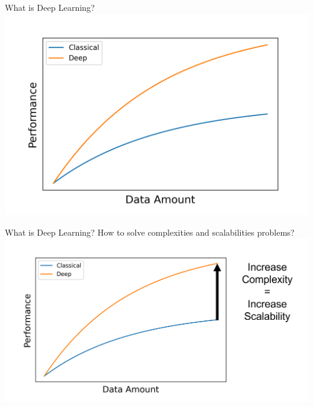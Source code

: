 \documentclass{beamer}
\begin{document}
\begin{frame}[fragile]{What is Deep Learning?}
    \includegraphics[width=\textwidth,height=\textheight,keepaspectratio]{figures/Deep vs Classical.png}
\end{frame}
\begin{frame}[fragile]{What is Deep Learning?}
    How to solve complexities and scalabilities problems?
    \includegraphics[width=\textwidth,height=\textheight,keepaspectratio]{figures/Deep vs Classical 2.png}
\end{frame}
\end{document}
